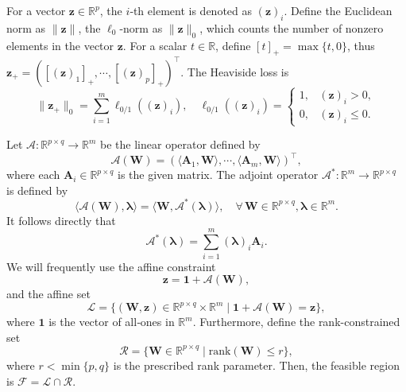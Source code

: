 \documentclass[sn-mathphys]{JORSC-jnl}%
\theoremstyle{thmstyleone}%
\theoremstyle{thmstylethree}%
\theoremstyle{thmstyleone} %
\begin{document}
For a vector $\mathbf{z}\in\mathbb{R}^p$, the $i$‑th element is denoted as $(\mathbf{z})_i$.
Define the Euclidean norm as $\|\mathbf{z}\|$, the $\ell_0$-norm as $\|\mathbf{z}\|_0$, which counts the number of
nonzero elements in the vector $\mathbf{z}$. 
For a scalar $t \in \mathbb{R}$, define $[t]_+ = \max\{t, 0\}$, thus $\mathbf{z}_+ = ([(\mathbf{z})_1]_+, \cdots, [(\mathbf{z})_p]_+)^\top$. The Heaviside loss is
\begin{equation*}
\|\mathbf{z}_+\|_0=\sum_{i=1}^m \ell_{0/1}((\mathbf{z})_i), \quad
\ell_{0/1}((\mathbf{z})_i)=
\begin{cases}
1,& (\mathbf{z})_i>0,\\
0,& (\mathbf{z})_i\le 0.
\end{cases}
\end{equation*}




Let $\mathscr{A}:\mathbb{R}^{p\times q}\rightarrow\mathbb{R}^m$ be the linear operator defined by
\begin{equation*}
\mathscr{A}(\mathbf{W})=
(\langle \mathbf{A}_1,\mathbf{W}\rangle,\cdots,\langle \mathbf{A}_m,\mathbf{W}\rangle)^\top,
\end{equation*}
where each $\mathbf{A}_i\in\mathbb{R}^{p\times q}$ is the given matrix. The adjoint operator $\mathscr{A}^*:\mathbb{R}^m\rightarrow\mathbb{R}^{p\times q}$ is defined by 
\begin{equation*}
\langle \mathscr{A}(\mathbf{W}),\bm{\lambda}\rangle
=
\langle \mathbf{W},\mathscr{A}^*(\bm{\lambda})\rangle,\quad
\forall\,\mathbf{W}\in\mathbb{R}^{p\times q}, \bm{\lambda}\in\mathbb{R}^m.
\end{equation*}
It follows directly that
\begin{equation*}
\mathscr{A}^*(\bm{\lambda})=\sum_{i=1}^m (\bm\lambda)_i \mathbf{A}_i.
\end{equation*}
We will frequently use the affine constraint
\begin{equation*}
\mathbf{z}=\mathbf{1}+\mathscr{A}(\mathbf{W}),
\end{equation*}
and  the affine set
\begin{equation*}
\mathcal{L}=\{(\mathbf{W},\mathbf{z})\in\mathbb{R}^{p\times q}\times\mathbb{R}^m \mid \mathbf{1}+\mathscr{A}(\mathbf{W})=\mathbf{z}\},
\end{equation*}
where  $\mathbf{1}$ is the vector of all‑ones in $\mathbb{R}^m$.  Furthermore, define the rank-constrained set
\begin{equation*}
\mathcal{R}=\{\mathbf{W}\in\mathbb{R}^{p\times q} \mid \mathrm{rank}(\mathbf{W})\le r\},
\end{equation*}
where $r<\min\{p,q\}$ is the prescribed rank parameter. Then, the feasible region is $\mathcal{F}=\mathcal{L}\cap\mathcal{R}$.
\end{document}
